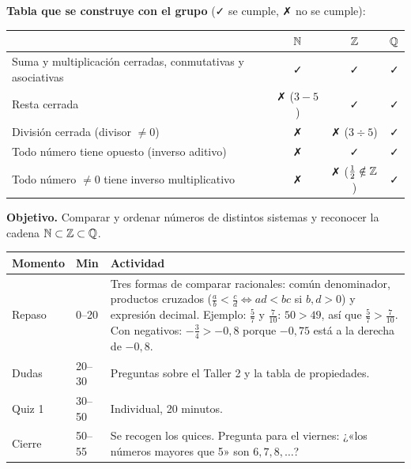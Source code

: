 \documentclass[11pt]{article}
\begin{document}
\textbf{Tabla que se construye con el grupo} (✓ se cumple, ✗ no se cumple):
\begin{center}
{\renewcommand{\arraystretch}{1.3}
\begin{tabular}{lccc}
  \toprule
  & $\mathbb{N}$ & $\mathbb{Z}$ & $\mathbb{Q}$\\
  \midrule
  Suma y multiplicación cerradas, conmutativas y asociativas & ✓ & ✓ & ✓\\
  Resta cerrada & ✗ ($3 - 5$) & ✓ & ✓\\
  División cerrada (divisor $\neq 0$) & ✗ & ✗ ($3 \div 5$) & ✓\\
  Todo número tiene opuesto (inverso aditivo) & ✗ & ✓ & ✓\\
  Todo número $\neq 0$ tiene inverso multiplicativo & ✗ & ✗ ($\frac{1}{2} \notin \mathbb{Z}$) & ✓\\
  \bottomrule
\end{tabular}}
\end{center}


\textbf{Objetivo.} Comparar y ordenar números de distintos sistemas y reconocer la cadena
$\mathbb{N} \subset \mathbb{Z} \subset \mathbb{Q}$.

\begin{center}
{\renewcommand{\arraystretch}{1.3}
\begin{tabularx}{\linewidth}{@{}l l X@{}}
  \toprule
  \textbf{Momento} & \textbf{Min} & \textbf{Actividad}\\
  \midrule
  Repaso & 0–20 & Tres formas de comparar racionales: común denominador, productos
    cruzados ($\frac{a}{b} < \frac{c}{d} \iff ad < bc$ si $b, d > 0$) y expresión decimal.
    Ejemplo: $\frac{5}{7}$ y $\frac{7}{10}$: $50 > 49$, así que $\frac{5}{7} > \frac{7}{10}$.
    Con negativos: $-\frac{3}{4} > -0{,}8$ porque $-0{,}75$ está a la derecha de $-0{,}8$.\\
  Dudas & 20–30 & Preguntas sobre el Taller 2 y la tabla de propiedades.\\
  Quiz 1 & 30–50 & Individual, 20 minutos.\\
  Cierre & 50–55 & Se recogen los quices. Pregunta para el viernes: ¿«los números mayores
    que 5» son $6, 7, 8, \ldots$?\\
  \bottomrule
\end{tabularx}}
\end{center}

\end{document}
